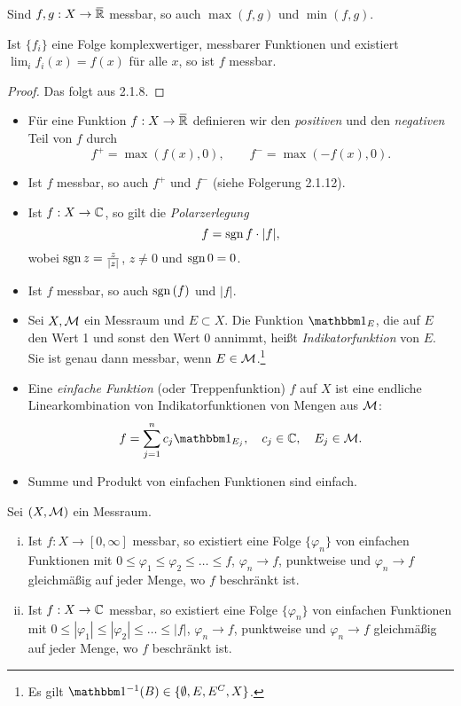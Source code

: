 \begin{folg}
 Sind $f,g : X \to \realext$ messbar, so auch $\max(f,g)$ und $\min(f,g)$.
\end{folg}

\begin{folg}
 Ist $\{f_i\}$ eine Folge komplexwertiger, messbarer Funktionen und existiert $\lim_i f_i(x) = f(x)$ für alle $x$, so ist $f$ messbar.
\end{folg}

\begin{proof}
 Das folgt aus 2.1.8.
\end{proof}

\begin{deno}
 \begin{itemize}
  \item Für eine Funktion $f: X \to \realext$ definieren wir den \emph{positiven} und den \emph{negativen} Teil von $f$ durch 
  \[ f^+ = \max( f(x), 0 ), \qquad f^- = \max( -f(x), 0 ). \]
  \item Ist $f$ messbar, so auch $f^+$ und $f^-$ (siehe Folgerung 2.1.12). 
  \item Ist $f:X \to \mathbb{C}$, so gilt die \emph{Polarzerlegung}
  \[ f = \mathrm{sgn}\, f \cdot |f|, \]
  wobei $\mathrm{sgn}\, z = \frac{z}{|z|}$, $z \ne 0$ und $\mathrm{sgn}\, 0 = 0$.
  \item Ist $f$ messbar, so auch $\mathrm{sgn}\,(f)$ und $|f|$.
  \item Sei $X, \mathcal{M}$ ein Messraum und $E \subset X$. Die Funktion $\ind_E$, die auf $E$ den Wert 1 und sonst den Wert 0 annimmt, heißt \emph{Indikatorfunktion} von $E$. Sie ist genau dann messbar, wenn $E \in \mathcal{M}$.\footnote{Es gilt $\ind^{-1}( B ) \in \{ \emptyset, E, E^C, X \}$.}
  \item Eine \emph{einfache Funktion} (oder Treppenfunktion) $f$ auf $X$ ist eine endliche Linearkombination von Indikatorfunktionen von Mengen aus $\mathcal{M}$: 
  \[ f = \sum_{j=1}^n c_j \ind_{E_j}, \quad c_j \in \complex, \quad E_j \in \meas. \]
  \item Summe und Produkt von einfachen Funktionen sind einfach.
 \end{itemize}
\end{deno}

\begin{thm}
 Sei $(X, \mathcal{M})$ ein Messraum.
 \begin{enumerate}[(i)]
  \item Ist $f: X \to [0, \infty]$ messbar, so existiert eine Folge $\{ \varphi_n \}$ von einfachen Funktionen mit $0 \le \varphi_1 \le \varphi_2 \le \ldots \le f$, $\varphi_n \to f$, punktweise und $\varphi_n \to f$ gleichmäßig auf jeder Menge, wo $f$ beschränkt ist.
  \item Ist $f: X \to \mathbb{C}$ messbar, so existiert eine Folge $\{ \varphi_n \}$ von einfachen Funktionen mit $0 \le |\varphi_1| \le |\varphi_2| \le \ldots \le |f|$, $\varphi_n \to f$, punktweise und $\varphi_n \to f$ gleichmäßig auf jeder Menge, wo $f$ beschränkt ist.
 \end{enumerate}
\end{thm}


